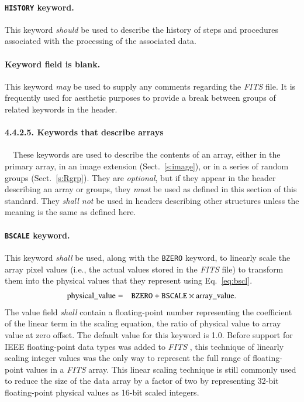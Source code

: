 \documentclass[onecolumn]{aa}
\begin{document}
 \paragraph{{\tt HISTORY} keyword.}
  This keyword {\em should} be used to describe 
  the history of steps and procedures associated
 with the processing of the associated data.
  
 \paragraph{Keyword field is blank.}
  This keyword {\em may} be used to supply any comments regarding the {\em FITS\/} file.
  It is frequently used for aesthetic purposes to provide a break between 
  groups of related keywords in the header.

   \paragraph{4.4.2.5. Keywords that describe arrays}
   \label{s:array}

\ \newline \ \newline   These keywords are used to describe the contents of an
   array, either in the primary array, in an image extension
   (Sect.\ \ref{s:image}), or in a series of
   random groups (Sect.\ \ref{s:Rgrp}).
   They are {\em optional}, but if they appear in the header describing 
   an array or groups, they {\em must} be used as defined in this
   section of this standard. They {\em shall not} be used in headers
   describing other structures unless the meaning is the same
   as defined here.
  
   \paragraph{{\tt BSCALE} keyword.}
   This keyword {\em shall} be  used, along with the {\tt BZERO}
 keyword, to linearly scale the array pixel values (i.e., the
 actual values stored in the {\em FITS\/} file) to transform them
 into the physical values that they
 represent using Eq.~\ref{eq:bscl}. 
 \begin{eqnarray}  
  \mbox{physical\_value} & = & \mbox{{\tt BZERO}} + 
                               \mbox{{\tt BSCALE}}
                              \times \mbox{array\_value}. \label{eq:bscl}
\end{eqnarray}
 The value field {\em shall}
 contain a floating-point number representing the coefficient of
 the linear term in the scaling equation, the ratio of physical
 value to array value at zero offset.  The
 default value for this keyword is 1.0.  Before support for IEEE
 floating-point data types was added to {\em FITS\/} \citep{wells90}, this 
 technique of linearly scaling integer values was the only way to 
 represent the full range of floating-point values
 in a {\em FITS\/} array.   This linear scaling technique is still commonly used 
 to reduce the size of the data array by a factor of two by representing 
 32-bit floating-point physical values as 16-bit scaled integers.
\end{document}
